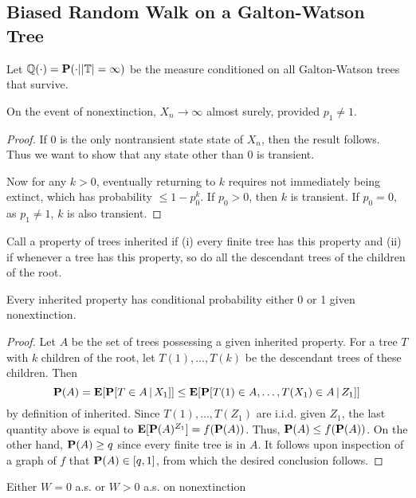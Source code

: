 \subsection{Biased Random Walk on a Galton-Watson Tree}
Let $\mathbb{Q}(\cdot)=\mathbf{P}(\cdot||\mathbb{T}|=\infty)$ be the measure conditioned on all Galton-Watson trees that survive.
\begin{lemma}
    On the event of nonextinction, \(X_n \to \infty\) almost surely, provided \(p_1 \neq 1\).
\end{lemma}
\begin{proof}
    If 0 is the only nontransient state state of $X_n$, then the result follows. Thus we want to show that any state other than 0 is transient.

    Now for any $k>0$, eventually returning to $k$ requires not immediately being extinct, which has probability $\leq 1-p_0^k$.
    If $p_0>0$, then $k$ is transient. If $p_0=0$, as $p_1\neq 1$, $k$ is also transient.
\end{proof}

\begin{definition}
    Call a property of trees inherited if \newline
    (i) every finite tree has this property and \newline 
    (ii) if whenever a tree has this property, so do all the descendant trees of the children of
the root.
\end{definition}
\begin{theorem}
    Every inherited property has conditional probability either 0 or 1 given
nonextinction.
\end{theorem}
\begin{proof}
    Let \(A\) be the set of trees possessing a given inherited property. For a tree \(T\) with \(k\) children of the root, let \(T(1), \ldots, T(k)\) be the descendant trees of these children. Then
\[
\mathbf{P}(A) = \mathbf{E}[\mathbf{P}[T \in A \,|\, X_1]] \leq \mathbf{E}[\mathbf{P}[T(1) \in A, \ldots, T(X_1) \in A \,|\, Z_1]]
\]
by definition of inherited. Since \(T(1), \ldots, T(Z_1)\) are i.i.d. given \(Z_1\), the last quantity above is equal to \(\mathbf{E}[\mathbf{P}(A)^{Z_1}] = f(\mathbf{P}(A))\). 
Thus, \(\mathbf{P}(A) \leq f(\mathbf{P}(A))\). On the other hand, \(\mathbf{P}(A) \geq q\) since every finite tree is in \(A\). 
It follows upon inspection of a graph of \(f\) that \(\mathbf{P}(A) \in [q, 1]\), from which the desired conclusion follows.
\end{proof}
\begin{corollary}
    Either $W = 0$ a.s. or $W > 0$ a.s. on nonextinction
\end{corollary}

